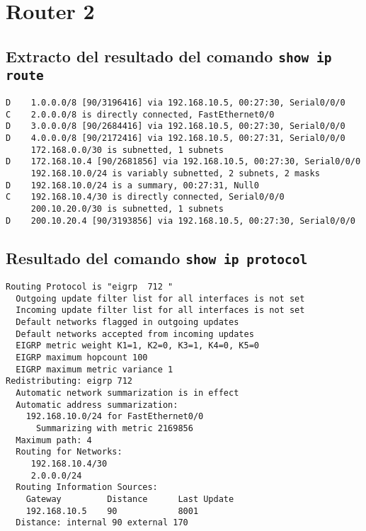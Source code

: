 \documentclass[12pt, times]{simauth}
\begin{document}
\section{Router 2}
\subsection{Extracto del resultado del comando \texttt{show ip route}}

\begin{verbatim}
D    1.0.0.0/8 [90/3196416] via 192.168.10.5, 00:27:30, Serial0/0/0
C    2.0.0.0/8 is directly connected, FastEthernet0/0
D    3.0.0.0/8 [90/2684416] via 192.168.10.5, 00:27:30, Serial0/0/0
D    4.0.0.0/8 [90/2172416] via 192.168.10.5, 00:27:31, Serial0/0/0
     172.168.0.0/30 is subnetted, 1 subnets
D    172.168.10.4 [90/2681856] via 192.168.10.5, 00:27:30, Serial0/0/0
     192.168.10.0/24 is variably subnetted, 2 subnets, 2 masks
D    192.168.10.0/24 is a summary, 00:27:31, Null0
C    192.168.10.4/30 is directly connected, Serial0/0/0
     200.10.20.0/30 is subnetted, 1 subnets
D    200.10.20.4 [90/3193856] via 192.168.10.5, 00:27:30, Serial0/0/0
\end{verbatim}

\subsection{Resultado del comando \texttt{show ip protocol}}
\begin{verbatim}
Routing Protocol is "eigrp  712 " 
  Outgoing update filter list for all interfaces is not set 
  Incoming update filter list for all interfaces is not set 
  Default networks flagged in outgoing updates  
  Default networks accepted from incoming updates 
  EIGRP metric weight K1=1, K2=0, K3=1, K4=0, K5=0
  EIGRP maximum hopcount 100
  EIGRP maximum metric variance 1
Redistributing: eigrp 712
  Automatic network summarization is in effect  
  Automatic address summarization: 
    192.168.10.0/24 for FastEthernet0/0
      Summarizing with metric 2169856
  Maximum path: 4
  Routing for Networks:  
     192.168.10.4/30
     2.0.0.0/24
  Routing Information Sources:  
    Gateway         Distance      Last Update 
    192.168.10.5    90            8001       
  Distance: internal 90 external 170
\end{verbatim}
\end{document}
